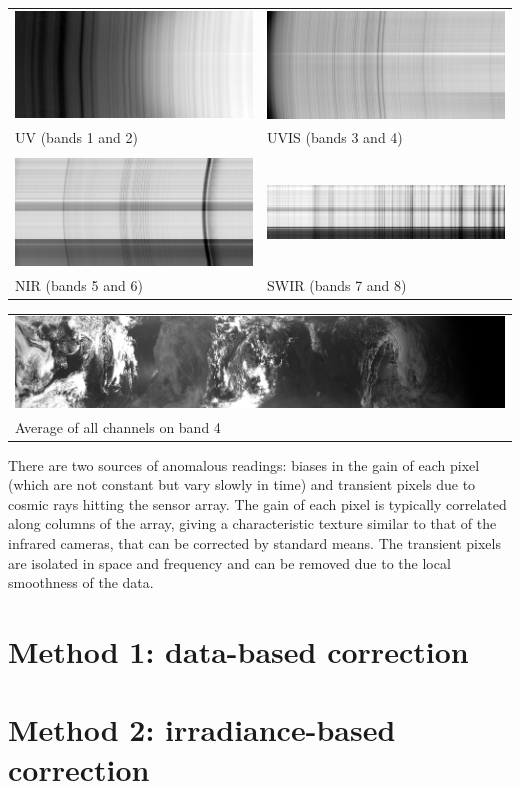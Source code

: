 \documentclass[a4paper]{article}    %
\theoremstyle{note}
\theoremstyle{plain}
\begin{document}
\begin{tabular}{ll}
	\includegraphics[width=0.48\linewidth]{f/lglint_12.png} &
	\includegraphics[width=0.48\linewidth]{f/lglint_34.png} \\
	UV (bands 1 and 2)& UVIS (bands 3 and 4) \\
	& \\
	\includegraphics[width=0.48\linewidth]{f/lglint_56.png} &
	\includegraphics[width=0.48\linewidth]{f/lglint_78.png} \\
	NIR (bands 5 and 6) & SWIR (bands 7 and 8)
\end{tabular}


\begin{tabular}{l}
\includegraphics[width=\linewidth]{f/slice_b4_glint.png} \\
Average of all channels on band 4
\end{tabular}


There are two sources of anomalous readings: biases in the gain of each pixel
(which are not constant but vary slowly in time) and transient pixels due to
cosmic rays hitting the sensor array.  The gain of each pixel is typically
correlated along columns of the array, giving a characteristic texture
similar to that of the infrared cameras, that can be corrected by standard
means.  The transient pixels are isolated in space and frequency and can be
removed due to the local smoothness of the data.


\section{Method 1: data-based correction}

\section{Method 2: irradiance-based correction}
\end{document}
